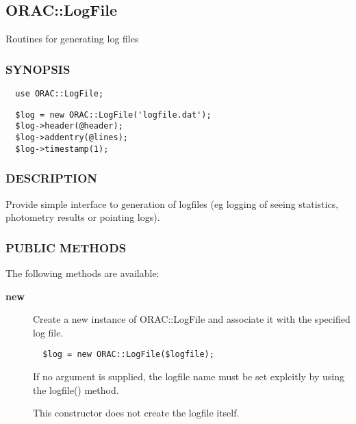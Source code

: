 \begin{description}
\subsection{ORAC::LogFile\label{ORAC::LogFile}}


Routines for generating log files

\subsubsection*{SYNOPSIS\label{ORAC::LogFile_SYNOPSIS}}
\begin{verbatim}
  use ORAC::LogFile;
\end{verbatim}
\begin{verbatim}
  $log = new ORAC::LogFile('logfile.dat');
  $log->header(@header);
  $log->addentry(@lines);
  $log->timestamp(1);
\end{verbatim}
\subsubsection*{DESCRIPTION\label{ORAC::LogFile_DESCRIPTION}}


Provide simple interface to generation of logfiles (eg logging
of seeing statistics, photometry results or pointing logs).

\subsubsection*{PUBLIC METHODS\label{ORAC::LogFile_PUBLIC_METHODS}}


The following methods are available:

\begin{description}

\item[{\textbf{new}}] \mbox{}

Create a new instance of ORAC::LogFile and associate it with the
specified log file.

\begin{verbatim}
  $log = new ORAC::LogFile($logfile);
\end{verbatim}


If no argument is supplied, the logfile name must be set explcitly
by using the logfile() method.



This constructor does not create the logfile itself.



\end{description}
\end{description}
